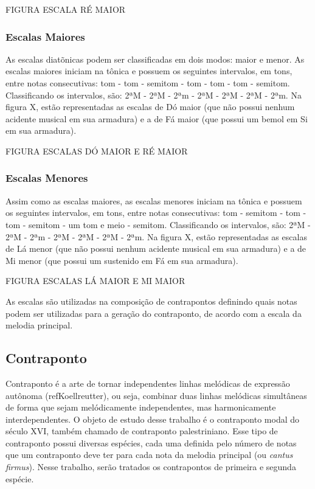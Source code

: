       FIGURA ESCALA RÉ MAIOR

      \subsubsection[Escalas Maiores]{Escalas Maiores}

        As escalas diatõnicas podem ser classificadas em dois modos: maior e menor. As escalas maiores iniciam na tônica e possuem os seguintes intervalos, em tons, entre notas consecutivas: tom - tom - semitom - tom - tom - tom - semitom. Classificando os intervalos, são: 2ªM - 2ªM - 2ªm - 2ªM - 2ªM - 2ªM - 2ªm. Na figura X, estão representadas as escalas de Dó maior (que não possui nenhum acidente musical em sua armadura) e a de Fá maior (que possui um bemol em Si em sua armadura).

        FIGURA ESCALAS DÓ MAIOR E RÉ MAIOR

      \subsubsection[Escalas Menores]{Escalas Menores}

        Assim como as escalas maiores, as escalas menores iniciam na tônica e possuem os seguintes intervalos, em tons, entre notas consecutivas: tom - semitom - tom - tom - semitom - um tom e meio - semitom. Classificando os intervalos, são: 2ªM - 2ªM - 2ªm - 2ªM - 2ªM - 2ªM - 2ªm. Na figura X, estão representadas as escalas de Lá menor (que não possui nenhum acidente musical em sua armadura) e a de Mi menor (que possui um sustenido em Fá em sua armadura).

        FIGURA ESCALAS LÁ MAIOR E MI MAIOR

        As escalas são utilizadas na composição de contrapontos definindo quais notas podem ser utilizadas para a geração do contraponto, de acordo com a escala da melodia principal.

    \subsection[Contraponto]{Contraponto}

      Contraponto é a arte de tornar independentes linhas melódicas de expressão autônoma (refKoellreutter), ou seja, combinar duas linhas melódicas simultâneas de forma que sejam melódicamente independentes, mas harmonicamente interdependentes. O objeto de estudo desse trabalho é o contraponto modal do século XVI, também chamado de contraponto palestriniano. Esse tipo de contraponto possui diversas espécies, cada uma definida pelo número de notas que um contraponto deve ter para cada nota da melodia principal (ou \textit{cantus firmus}). Nesse trabalho, serão tratados os contrapontos de primeira e segunda espécie.

